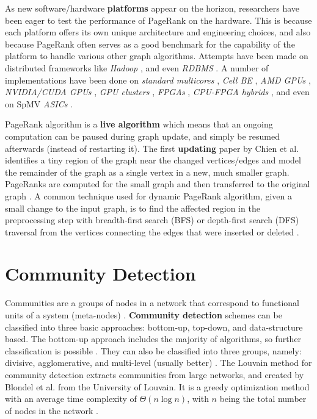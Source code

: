 As new software/hardware \textbf{platforms} appear on the horizon, researchers have been eager to test the performance of PageRank on the hardware. This is because each platform offers its own unique architecture and engineering choices, and also because PageRank often serves as a good benchmark for the capability of the platform to handle various other graph algorithms. Attempts have been made on distributed frameworks like \textit{Hadoop} \cite{pr-abdullah10}, and even \textit{RDBMS} \cite{compute-barolli21}. A number of implementations have been done on \textit{standard multicores} \cite{compute-barolli21}, \textit{Cell BE} \cite{compute-buehrer08} \cite{pr-zhou17}, \textit{AMD GPUs} \cite{pr-wu10}, \textit{NVIDIA/CUDA GPUs} \cite{pr-bisson16} \cite{pr-zhou17} \cite{graph-seo15}, \textit{GPU clusters} \cite{pr-rungsawang12}, \textit{FPGAs} \cite{pr-mughrabi21} \cite{graph-wang15} \cite{pr-guoqiang20}, \textit{CPU-FPGA hybrids} \cite{pr-hassan21} \cite{pr-usta21} \cite{pr-li21}, and even on SpMV \textit{ASICs} \cite{pr-sadi18}.

PageRank algorithm is a \textbf{live algorithm} which means that an ongoing computation can be paused during graph update, and simply be resumed afterwards (instead of restarting it). The first \textbf{updating} paper by Chien et al. \cite{pr-chien01} identifies a tiny region of the graph near the changed vertices/edges and model the remainder of the graph as a single vertex in a new, much smaller graph. PageRanks are computed for the small graph and then transferred to the original graph \cite{pr-deeper01}. A common technique used for dynamic PageRank algorithm, given a small change to the input graph, is to find the affected region in the preprocessing step with breadth-first search (BFS) or depth-first search (DFS) traversal from the vertices connecting the edges that were inserted or deleted \cite{pr-desikan05} \cite{pr-giri20}.




\section{Community Detection}

Communities are a groups of nodes in a network that correspond to functional units of a system (meta-nodes) \cite{com-chatterjee19}. \textbf{Community detection} schemes can be classified into three basic approaches: bottom-up, top-down, and data-structure based. The bottom-up approach includes the majority of algorithms, so further classification is possible \cite{com-souravlas21}. They can also be classified into three groups, namely: divisive, agglomerative, and multi-level (usually better) \cite{com-zarayeneh21}. The Louvain method for community detection extracts communities from large networks, and created by Blondel et al. \cite{com-blondel08} from the University of Louvain. It is a greedy optimization method with an average time complexity of $\Theta (n \log n)$, with $n$ being the total number of nodes in the network \cite{com-lancichinetti09}.

